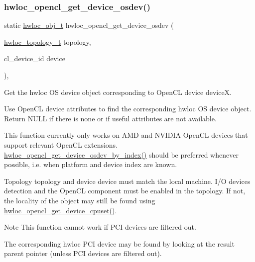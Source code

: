 \subsubsection{\texorpdfstring{hwloc\+\_\+opencl\+\_\+get\+\_\+device\+\_\+osdev()}{hwloc\_opencl\_get\_device\_osdev()}}
{\footnotesize\ttfamily static \hyperlink{a00185_ga79b8ab56877ef99ac59b833203391c7d}{hwloc\+\_\+obj\+\_\+t} hwloc\+\_\+opencl\+\_\+get\+\_\+device\+\_\+osdev (\begin{DoxyParamCaption}\item[{\hyperlink{a00186_ga9d1e76ee15a7dee158b786c30b6a6e38}{hwloc\+\_\+topology\+\_\+t}}]{topology,  }\item[{cl\+\_\+device\+\_\+id}]{device }\end{DoxyParamCaption})\hspace{0.3cm}{\ttfamily [inline]}, {\ttfamily [static]}}



Get the hwloc OS device object corresponding to Open\+CL device {\ttfamily deviceX}. 

Use Open\+CL device attributes to find the corresponding hwloc OS device object. Return N\+U\+LL if there is none or if useful attributes are not available.

This function currently only works on A\+MD and N\+V\+I\+D\+IA Open\+CL devices that support relevant Open\+CL extensions. \hyperlink{a00218_gae39352d124cb330eb37b84b418ed6cc5}{hwloc\+\_\+opencl\+\_\+get\+\_\+device\+\_\+osdev\+\_\+by\+\_\+index()} should be preferred whenever possible, i.\+e. when platform and device index are known.

Topology {\ttfamily topology} and device {\ttfamily device} must match the local machine. I/O devices detection and the Open\+CL component must be enabled in the topology. If not, the locality of the object may still be found using \hyperlink{a00218_gacc32737d4648d16b0d292438f210ec90}{hwloc\+\_\+opencl\+\_\+get\+\_\+device\+\_\+cpuset()}.

\begin{DoxyNote}{Note}
This function cannot work if P\+CI devices are filtered out.

The corresponding hwloc P\+CI device may be found by looking at the result parent pointer (unless P\+CI devices are filtered out). 
\end{DoxyNote}
\mbox{\label{a00218_gae39352d124cb330eb37b84b418ed6cc5}} 
